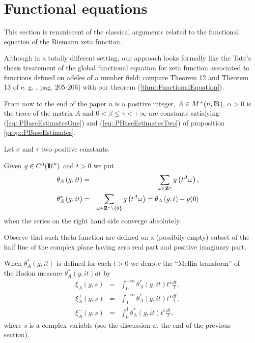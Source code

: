 \documentclass[12pt,a4paper]{amsart}
\begin{document}
\section{\label{section:SectionFuncEq}Functional equations}
{
This section is reminiscent of
the classical arguments related
to the functional equation of the Riemann zeta function.

Although in a totally different setting,
our approach looks formally like the Tate's thesis treatement
of the global functional equation for zeta function associated to
functions defined on adeles of a number field: 
compare Theorem 12 and Theorem 13 of e. g.
\cite{book:LangAlgebraicNumerTheory}, pag. 205-206)
with our theorem (\ref{thm::FunctionalEquation}).

From now to the end of the paper
${n}$ is a positive integer,
${A}\in{{{M}^+}({n},{{\rm I\kern-.185em R}})}$,
${\alpha}>0$ is the trace of the matrix ${A}$ and
$0<{\beta}\leq{\gamma}<+\infty$ are constants satisfying
(\ref{eq::PBaseEstimatesOne}) and (\ref{eq::PBaseEstimatesTwo})
of proposition \ref{prop::PBaseEstimates}.

Let ${\sigma}$ and ${\tau}$ two positive constants.

Given ${g}\in C^0({{\rm I\kern-.185em R}}^{n})$ and ${t}>0$ we put
\begin{eqnarray}
	{{\theta}_{{A}}\left({g},{i{t}}\right)}&=&
	\sum_{{\omega}\in{{\bf Z}}^{n}}
	{g}\left({t}^{A}{\omega}\right),
	\nonumber\\
	{{\theta}_{{A}}^*\left({{g}},{i{t}}\right)}&=&
	\sum_{{\omega}\in{{\bf Z}}^{n}\setminus\{0\}}
	{g}\left({t}^{A}{\omega}\right)=
	{{\theta}_{{A}}\left({g},{{t}}\right)}-{g}(0)
	\nonumber
\end{eqnarray}
when the series on the right hand side converge absolutely.

Observe that such theta function are defined on
a (possibily empty) subset of
the half line of the complex plane
having zero real part and positive imaginary part.

When ${{\theta}_{{A}}^*\left({{g}},{i{t}}\right)}$ is defined
for each ${t}>0$ we denote the ``Mellin transform''
of the Radon measure
${{\theta}_{{A}}^*\left({{g}},{i{t}}\right)}d{t}$
by
\begin{eqnarray}
	{{\xi}_{{A}}\left({g},{s}\right)}&=&
	\int_0^{+\infty}{{\theta}_{{A}}^*\left({{g}},{i{t}}\right)}
	{t}^{s}\frac{d{t}}{t},
	\nonumber\\
	{{\xi}_{{A}}^+\left({g},{s}\right)}&=&
	\int_1^{+\infty}{{\theta}_{{A}}^*\left({{g}},{i{t}}\right)}
	{t}^{s}\frac{d{t}}{t},
	\nonumber\\
	{{\xi}_{A}^-\left({g},{s}\right)}&=&
	\int_0^1{{\theta}_{{A}}^*\left({{g}},{i{t}}\right)}
	{t}^{s}\frac{d{t}}{t},
	\nonumber
\end{eqnarray}
where ${s}$ is a complex variable
(see the discussion at the end of the previous section).

}
\end{document}
